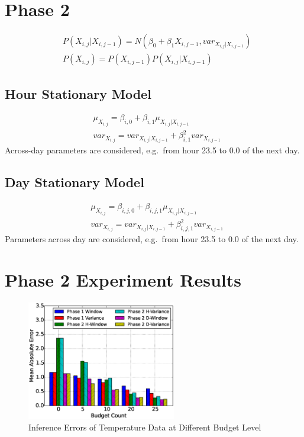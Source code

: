 \documentclass[12pt]{article}  %
\theoremstyle{definition}
\theoremstyle{remark}
\begin{document}
\section{Phase 2}

\begin{align}
        & P(X_{i,j}|X_{i,j-1}) = N(\beta_0 + \beta_1 X_{i,j-1}, var_{X_{i,j}|X_{i,j-1}}) \\
        & P(X_{i,j}) = P(X_{i, j-1})P(X_{i,j}|X_{i, j-1})
\end{align}

\subsection{Hour Stationary Model}
\begin{align}
        & \mu_{X_{i,j}} = \beta_{i,0} + \beta_{i,1} \mu_{X_{i,j}|X_{i,j-1}} \\
        & var_{X_{i,j}} = var_{X_{i,j}|X_{i,j-1}} + \beta_{i,1}^2 var_{X_{i,j-1}} 
\end{align}
Across-day parameters are considered, e.g.\ from hour 23.5 to 0.0 of the next day.

\subsection{Day Stationary Model}
\begin{align}
        & \mu_{X_{i,j}} = \beta_{i,j,0} + \beta_{i,j,1} \mu_{X_{i,j}|X_{i,j-1}} \\
        & var_{X_{i,j}} = var_{X_{i,j}|X_{i,j-1}} + \beta_{i,j,1}^2 var_{X_{i,j-1}} 
\end{align}
Parameters across day are considered, e.g.\ from hour 23.5 to 0.0 of the next day.


\section{Phase 2 Experiment Results}
\label{sec:phase2:result}

\begin{figure}[h]
\centering
        \includegraphics[width=0.58\textwidth]{../phase2/temperature_err}
\caption{Inference Errors of Temperature Data at Different Budget Level}
\label{fig:phase1:temperature}
\end{figure}
\end{document}
